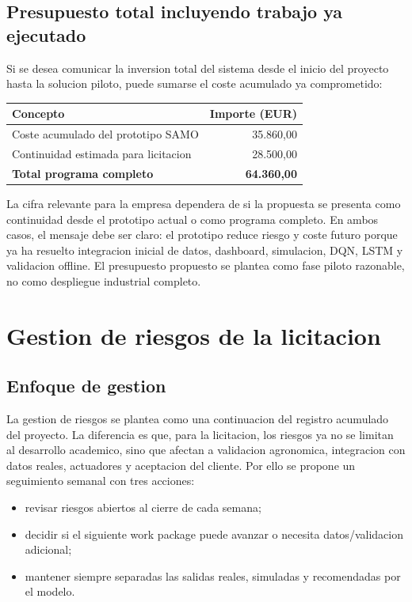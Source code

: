 ﻿\documentclass[11pt,a4paper]{article}
\begin{document}
\subsection{Presupuesto total incluyendo trabajo ya ejecutado}

Si se desea comunicar la inversion total del sistema desde el inicio del proyecto hasta la solucion piloto, puede sumarse el coste acumulado ya comprometido:

\begin{table}[H]
\centering
\begin{tabular}{p{8cm}r}
\toprule
\textbf{Concepto} & \textbf{Importe (EUR)} \\
\midrule
Coste acumulado del prototipo SAMO & 35.860,00 \\
Continuidad estimada para licitacion & 28.500,00 \\
\midrule
\textbf{Total programa completo} & \textbf{64.360,00} \\
\bottomrule
\end{tabular}
\end{table}

La cifra relevante para la empresa dependera de si la propuesta se presenta como continuidad desde el prototipo actual o como programa completo. En ambos casos, el mensaje debe ser claro: el prototipo reduce riesgo y coste futuro porque ya ha resuelto integracion inicial de datos, dashboard, simulacion, DQN, LSTM y validacion offline. El presupuesto propuesto se plantea como fase piloto razonable, no como despliegue industrial completo.

\newpage

\section{Gestion de riesgos de la licitacion}

\subsection{Enfoque de gestion}

La gestion de riesgos se plantea como una continuacion del registro acumulado del proyecto. La diferencia es que, para la licitacion, los riesgos ya no se limitan al desarrollo academico, sino que afectan a validacion agronomica, integracion con datos reales, actuadores y aceptacion del cliente. Por ello se propone un seguimiento semanal con tres acciones:

\begin{itemize}
    \item revisar riesgos abiertos al cierre de cada semana;
    \item decidir si el siguiente work package puede avanzar o necesita datos/validacion adicional;
    \item mantener siempre separadas las salidas reales, simuladas y recomendadas por el modelo.
\end{itemize}
\end{document}
